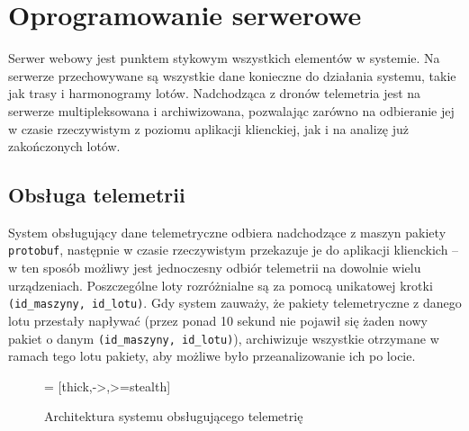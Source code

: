 \section{Oprogramowanie serwerowe}

Serwer webowy jest punktem stykowym wszystkich elementów w systemie.
Na serwerze przechowywane są wszystkie dane konieczne do działania systemu, takie jak
trasy i harmonogramy lotów. Nadchodząca z dronów telemetria jest na 
serwerze multipleksowana i archiwizowana, pozwalając zarówno na odbieranie jej
w czasie rzeczywistym z poziomu aplikacji klienckiej, jak i na analizę już zakończonych lotów.

\subsection{Obsługa telemetrii}

System obsługujący dane telemetryczne odbiera nadchodzące z maszyn pakiety
\texttt{protobuf}, następnie w czasie rzeczywistym przekazuje je do aplikacji klienckich 
-- w ten sposób możliwy jest jednoczesny odbiór telemetrii na dowolnie wielu urządzeniach.
Poszczególne loty rozróżnialne są za pomocą unikatowej krotki
\texttt{(id\_maszyny, id\_lotu)}. Gdy system zauważy, że pakiety telemetryczne z danego
lotu przestały napływać (przez ponad 10 sekund nie pojawił się żaden nowy pakiet o danym
\texttt{(id\_maszyny, id\_lotu)}), archiwizuje wszystkie otrzymane w ramach tego lotu
pakiety, aby możliwe było przeanalizowanie ich po locie.


\begin{figure}[H]
	\centering\small
	\caption{
	 Architektura systemu obsługującego telemetrię 
	}
	\label{telemetry_backend_architecture}
	\hspace{-1.2cm}
 = [thick,->,>=stealth]
\end{figure}

